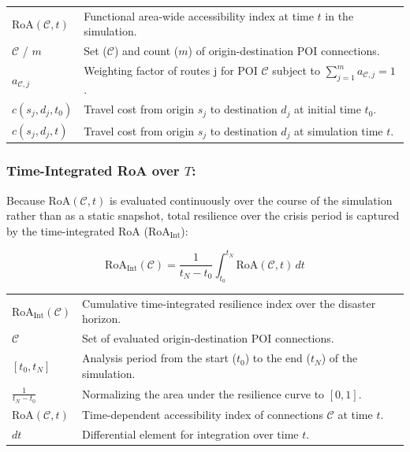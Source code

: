 \noindent
\begin{tabularx}{\textwidth}{@{}l X@{}}
    $\text{RoA}(\mathcal{C}, t)$ & Functional area-wide accessibility index at time $t$ in the simulation. \\
    $\mathcal{C}$ / $m$ & Set ($\mathcal{C}$) and count ($m$) of origin-destination POI connections. \\
    $a_{\mathcal{C},j}$ & Weighting factor of routes j for POI $\mathcal{C}$ subject to $\sum_{j=1}^{m} a_{\mathcal{C},j} = 1$. \\
    $c(s_j, d_j, t_0)$ & Travel cost from origin $s_j$ to destination $d_j$ at initial time $t_0$. \\
    $c(s_j, d_j, t)$ & Travel cost from origin $s_j$ to destination $d_j$ at simulation time $t$.
\end{tabularx}

\subsubsection{Time-Integrated RoA over $T$: }
Because $\text{RoA}(\mathcal{C}, t)$ is evaluated continuously over the course of the simulation rather than as a static snapshot, total resilience over the crisis period is captured by the time-integrated RoA ($\text{RoA}_{\text{Int}}$):

\begin{equation}
    \text{RoA}_{\text{Int}}(\mathcal{C}) = \frac{1}{t_N - t_0} \int_{t_0}^{t_N} \text{RoA}(\mathcal{C}, t) \, dt\label{eq:int_roa}
\end{equation}

\noindent
\begin{tabularx}{\textwidth}{@{}l X@{}}
    $\text{RoA}_{\text{Int}}(\mathcal{C})$ & Cumulative time-integrated resilience index over the disaster horizon. \\
    $\mathcal{C}$ & Set of evaluated origin-destination POI connections. \\
    $[t_0, t_N]$ & Analysis period from the start ($t_0$) to the end ($t_N$) of the simulation. \\
    $\frac{1}{t_N - t_0}$ & Normalizing the area under the resilience curve to $[0, 1]$. \\
    $\text{RoA}(\mathcal{C}, t)$ & Time-dependent accessibility index of connections $\mathcal{C}$ at time $t$. \\
    $dt$ & Differential element for integration over time $t$.
\end{tabularx}

